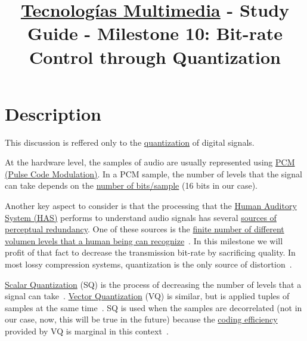 \title{\href{https://www.ual.es/estudios/grados/presentacion/plandeestudios/asignatura/4015/40154321?idioma=zh_CN}{Tecnologías Multimedia} - Study Guide - Milestone 10: Bit-rate Control through Quantization}

\maketitle

\section{Description}

This discussion is reffered only to the
\href{https://en.wikipedia.org/wiki/Quantization_(signal_processing)}{quantization}
of digital signals.

At the hardware level, the samples of audio are usually represented
using \href{https://en.wikipedia.org/wiki/Pulse-code_modulation}{PCM
  (Pulse Code Modulation)}. In a PCM sample, the number of levels that
the signal can take depends on the
\href{https://en.wikipedia.org/wiki/Audio_bit_depth}{number of
  bits/sample} (16 bits in our case).

Another key aspect to consider is that the processing that the
\href{https://en.wikipedia.org/wiki/Auditory_system}{Human Auditory
  System (HAS)} performs to understand audio signals has several
\href{https://en.wikipedia.org/wiki/Psychoacoustics}{sources of
  perceptual redundancy}. One of these sources is the
\href{https://en.wikipedia.org/wiki/Equal-loudness_contour}{finite
  number of different volumen levels that a human being can
  recognize}~\cite{bosi2003intro}. In this milestone we will profit of
that fact to decrease the transmission bit-rate by sacrificing
quality.  In most lossy compression systems, quantization is the only
source of distortion~\cite{taubman2002jpeg2000}.

\href{https://en.wikipedia.org/wiki/Quantization_(signal_processing)}{Scalar
  Quantization} (SQ) is the process of decreasing the number of levels
that a signal can
take~\cite{sayood2017introduction}. \href{https://en.wikipedia.org/wiki/Vector_quantization}{Vector
  Quantization} (VQ) is similar, but is applied tuples of samples at
the same time~\cite{vetterli2014foundations}. SQ is used when the
samples are decorrelated (not in our case, now, this will be true in
the future) because the
\href{https://en.wikipedia.org/wiki/Quantization_(signal_processing)#Rate%E2%80%93distortion_optimization}{coding
  efficiency} provided by VQ is marginal in this
context~\cite{vetterli2014foundations}.

